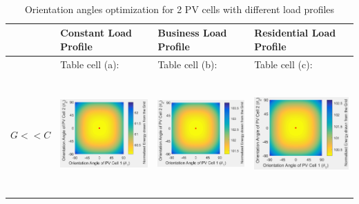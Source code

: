 \begin{table}[H] 
 \centering
\vspace{-0.5cm}\leftskip=-1.5cm
\captionsetup{justification=centering}
\caption{\\ Orientation angles optimization for 2 PV cells with different load profiles \label{table_2PV}}
  \begin{tabular}
      {@{ }m{}@{ }||@{ }M{0.34\columnwidth}@{ }|@{ }M{0.34\columnwidth}@{ }|@{ }M{0.34\columnwidth}@{ }} 
			&  Constant Load Profile &  Business Load Profile & Residential Load Profile \\ \hline\hline
			&  Table cell (a): & Table cell (b): &  Table cell (c): \\
			  $G<<C$ & \vspace{0.1cm}  \includegraphics[width=0.34\columnwidth, height=4.5cm]{pictures/results/rein_2PV_scale1_offset1_con}  & \vspace{0.1cm} \includegraphics[width=0.34\columnwidth, height=4.5cm]{pictures/results/rein_2PV_scale1_offset1_bis}  &
      \vspace{0.1cm} \includegraphics[width=0.34\columnwidth, height=4.5cm]{pictures/results/rein_2PV_scale1_offset1_res} \\
		

\end{tabular}
\end{table}
